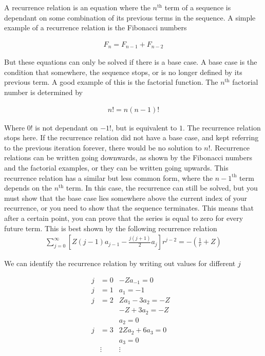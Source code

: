         A recurrence relation is an equation where the $n^{\text{th}}$ term of a sequence is dependant on some combination of its previous terms in the sequence. A simple example of a recurrence relation is the Fibonacci numbers

        \begin{align}
            F_n = F_{n - 1} + F_{n - 2}
        \end{align}

        But these equations can only be solved if there is a base case. A base case is the condition that somewhere, the sequence stops, or is no longer defined by its previous term. A good example of this is the factorial function. The $n^{\text{th}}$ factorial number is determined by 

        \begin{align}
            n! = n(n-1)!
        \end{align}

        Where $0!$ is not dependant on $-1!$, but is equivalent to $1$. The recurrence relation stops here. If the recurrence relation did not have a base case, and kept referring to the previous iteration forever, there would be no solution to $n!$. Recurrence relations can be written going downwards, as shown by the Fibonacci numbers and the factorial examples, or they can be written going upwards. This recurrence relation has a similar but less common form, where the $n-1^{\text{th}}$ term depends on the $n^{\text{th}}$ term. In this case, the recurrence can still be solved, but you must show that the base case lies somewhere above the current index of your recurrence, or you need to show that the sequence terminates. This means that after a certain point, you can prove that the series is equal to zero for every future term. This is best shown by the following recurrence relation 
        \begin{align}
            \sum_{j = 0}^\infty \left[ Z(j - 1) a_{j - 1} - \frac{j(j+1)}{2} a_j \right] r^{j - 2} = -\left(\frac{1}{r} + Z\right)
        \end{align}

        We can identify the recurrence relation by writing out values for different $j$ 

        \begin{align}
            j &= 0 & -Za_{-1} = 0&\\ \nonumber
            j &= 1 & a_1 = -1&\\ \nonumber
            j &= 2 & Za_1 - 3a_2 = -Z&\\ \nonumber
            & & -Z + 3a_2 = -Z&\\ \nonumber
            & & a_2 = 0&\\ \nonumber
            j &= 3 & 2Za_2 + 6a_3 = 0&\\ \nonumber
            & & a_3 = 0&\\ \nonumber
            & \vdots & \vdots & \\
        \end{align}

